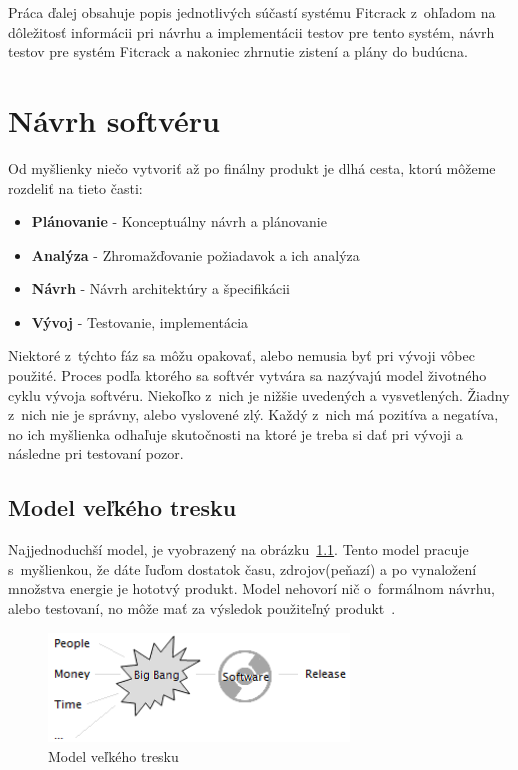 Práca ďalej obsahuje popis jednotlivých súčastí systému Fitcrack z~ohľadom na dôležitosť informácii pri návrhu a implementácii testov pre tento systém, návrh testov pre systém Fitcrack a nakoniec zhrnutie zistení a plány do budúcna.

\chapter{Návrh softvéru}
\label{tests_design}
Od myšlienky niečo vytvoriť až po finálny produkt je dlhá cesta, ktorú môžeme rozdeliť na tieto časti: 
\begin{itemize}
	\item \textbf{Plánovanie} - Konceptuálny návrh a plánovanie
	\item \textbf{Analýza} - Zhromažďovanie požiadavok a ich analýza
	\item \textbf{Návrh} - Návrh architektúry a špecifikácii
	\item \textbf{Vývoj} - Testovanie, implementácia
\end{itemize}
Niektoré z~týchto fáz sa môžu opakovať, alebo nemusia byť pri vývoji vôbec použité.
Proces podľa ktorého sa softvér vytvára sa nazývajú model životného cyklu vývoja softvéru.
Niekoľko z~nich je nižšie uvedených a vysvetlených.
Žiadny z~nich nie je správny, alebo vyslovené zlý.
Každý z~nich má pozitíva a negatíva, no ich myšlienka odhaľuje skutočnosti na ktoré je treba si dať pri vývoji a následne pri testovaní pozor.

\section{Model veľkého tresku}
\label{big_bang_model}
Najjednoduchší model, je vyobrazený na obrázku~\ref{big_bang_model_fig}.
Tento model pracuje s~myšlienkou, že dáte ľuďom dostatok času, zdrojov(peňazí) a po vynaložení množstva energie je hototvý produkt.
Model nehovorí nič o~formálnom návrhu, alebo testovaní, no môže mať za výsledok použiteľný produkt~\cite{Patton}.

\begin{figure}[h]
\centering
\includegraphics[width=8cm,keepaspectratio=true]{obrazky/big_bang_model.png}
\caption{Model veľkého tresku~\cite{models}}
\label{big_bang_model_fig}
\end{figure}

